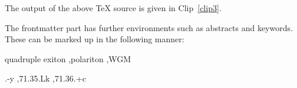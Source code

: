 \documentclass[a4paper,12pt]{article}
\begin{document}
\begin{vquote}
\author{K.~Bazargan}
 \address{River Valley Technologies, 9, Browns Court, Kennford,
   Exeter, UK.}
\end{vquote}

\begin{vquote}
\author{S.~Pepping}
 \address{Central Application Management,
   Elsevier, Radarweg 43, 1043 NX Amsterdam, Netherlands}
\end{vquote}

\begin{vquote}
\end{vquote}

The output of the above TeX source is given in Clip~\ref{clip3}.

\vspace*{12pt}
\def\rulecolor{blue!70}
\def\rulecolor{orange}


The frontmatter part has further environments such as abstracts and
keywords.  These can be marked up in the following
manner:


\begin{vquote}
 \begin{abstract}
  In this work we demonstrate the formation of a new type of 
  polariton on the interface between a ....
 \end{abstract}
\end{vquote} 

\begin{vquote}
 \begin{keyword}
  quadruple exiton \sep polariton \sep WGM

  .-y \sep 71.35.Lk \sep 71.36.+c
 \end{keyword}
\end{vquote}
\end{document}

